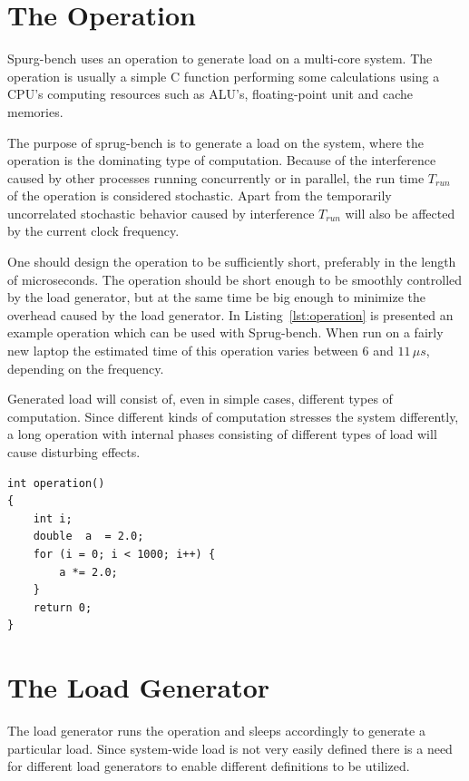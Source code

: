 \documentclass{article}
\begin{document}
\section{The Operation}

Spurg-bench uses an operation to generate load on a multi-core
system. The operation is usually a simple C function performing some
calculations using a CPU's computing resources such as ALU's,
floating-point unit and cache memories.

The purpose of sprug-bench is to generate a load on the system, where
the operation is the dominating type of computation. Because of the
interference caused by other processes running concurrently or in
parallel, the run time $T_{run}$ of the operation is considered
stochastic. Apart from the temporarily uncorrelated stochastic
behavior caused by interference $T_{run}$ will also be affected by the
current clock frequency. 

One should design the operation to be sufficiently short, preferably
in the length of microseconds. The operation should be short enough to
be smoothly controlled by the load generator, but at the same time be
big enough to minimize the overhead caused by the load generator. In
Listing~\ref{lst:operation} is presented an example operation which
can be used with Sprug-bench. When run on a fairly new laptop the
estimated time of this operation varies between $6$ and $11\,\mu s$,
depending on the frequency.

Generated load will consist of, even in simple cases, different types
of computation. Since different kinds of computation stresses the
system differently, a long operation with internal phases consisting
of different types of load will cause disturbing effects.

\lstset{
  language=C,
  numbers=left
}
\begin{lstlisting}[caption={Example of a operation using the processors floating-point units.},label={lst:operation}]
int operation()
{
	int	i;
	double	a  = 2.0;
	for (i = 0; i < 1000; i++) {
		a *= 2.0;
	}
	return 0;
}
\end{lstlisting}

\pagebreak
\section{The Load Generator}

The load generator runs the operation and sleeps accordingly to
generate a particular load. Since system-wide load is not very easily
defined there is a need for different load generators to enable
different definitions to be utilized.
\end{document}
